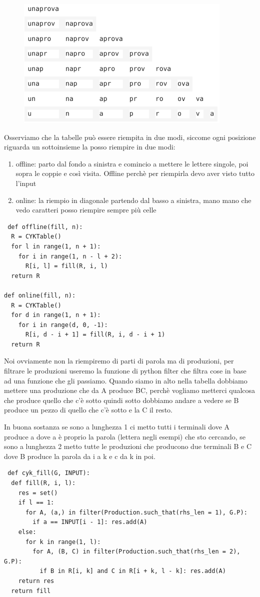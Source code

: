 \begin{figure}[ht!]
  \centering
  \includegraphics[scale=1]{images/Parsing/tabellaR.png}
\end{figure}


Osserviamo che la tabelle può essere riempita in due modi, siccome ogni posizione riguarda un sottoinsieme la posso riempire in due modi:
\begin{enumerate}
    \item offline: parto dal fondo a sinistra e comincio a mettere le lettere singole, poi sopra le coppie e così visita. Offline perchè per riempirla devo aver visto tutto l'input
    \item online: la riempio in diagonale partendo dal basso a sinistra, mano mano che vedo caratteri posso riempire sempre più celle
\end{enumerate}

\begin{lstlisting}
 def offline(fill, n):
  R = CYKTable()
  for l in range(1, n + 1):
    for i in range(1, n - l + 2): 
      R[i, l] = fill(R, i, l)
  return R 

def online(fill, n):
  R = CYKTable()
  for d in range(1, n + 1):
    for i in range(d, 0, -1):
      R[i, d - i + 1] = fill(R, i, d - i + 1)
  return R
\end{lstlisting}

Noi ovviamente non la riempiremo di parti di parola ma di produzioni, per filtrare le produzioni useremo la funzione di python filter che filtra cose in base ad una funzione che gli passiamo.
Quando siamo in alto nella tabella dobbiamo mettere una produzione che da A produce BC, perchè vogliamo metterci qualcosa che produce quello che c'è sotto quindi sotto dobbiamo andare a vedere se B produce un pezzo di quello che c'è sotto e la C il resto.

In buona sostanza se sono a lunghezza 1 ci metto tutti i terminali dove A produce a dove a è proprio la parola (lettera negli esempi) che sto cercando, se sono a lunghezza 2 metto tutte le produzioni che producono due terminali B e C dove B produce la parola da i a k e c da k in poi.
\begin{lstlisting}
 def cyk_fill(G, INPUT):
  def fill(R, i, l):
    res = set()
    if l == 1:
      for A, (a,) in filter(Production.such_that(rhs_len = 1), G.P): 
        if a == INPUT[i - 1]: res.add(A)
    else:
      for k in range(1, l):
        for A, (B, C) in filter(Production.such_that(rhs_len = 2), G.P):
          if B in R[i, k] and C in R[i + k, l - k]: res.add(A)
    return res
  return fill
\end{lstlisting}

